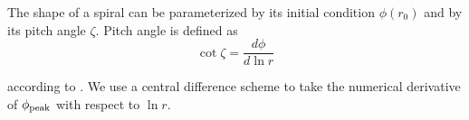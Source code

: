 \documentclass[twocolumn]{aastex631}
\begin{document}
The shape of a spiral can be parameterized by its initial condition $\phi(r_0)$ and by its pitch angle $\zeta$. Pitch angle
is defined as
\begin{equation}
    \cot \zeta = \frac{d\phi}{d \ln r}
\end{equation}

according to \citet{zhu2022}. We use a central difference scheme to take the numerical derivative of $\phi_{\rm peak}$ with respect to $\ln r$.










\end{document}
